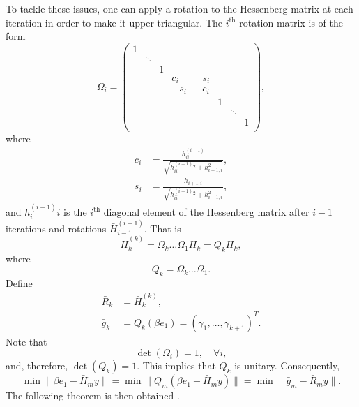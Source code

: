 To tackle these issues, one can apply a rotation to the Hessenberg matrix at each iteration in order to make it upper triangular. The $i^{\textrm{th}}$ rotation matrix is of the form \cite[Equation 6.34]{iter_method_saad}
\begin{equation}
    \Omega_i =
    \begin{pmatrix}
        1 &        &   &      &  &     &   &        &   \\
          & \ddots &   &      &  &     &   &        &   \\
          &        & 1 &      &  &     &   &        &   \\
          &        &   & c_i  &  & s_i &   &        &   \\
          &        &   & -s_i &  & c_i &   &        &   \\
          &        &   &      &  &     & 1 &        &   \\
          &        &   &      &  &     &   & \ddots &   \\
          &        &   &      &  &     &   &        & 1 \\
    \end{pmatrix},
\end{equation}
where \cite[Equation 6.37]{iter_method_saad}
\begin{align*}
    c_i & = \frac{h^(i-1)_{ii}}{\sqrt{h^(i-1)_{ii}^2 + h_{i+1,i}^2}}, \\
    s_i & = \frac{h_{i+1,i}}{\sqrt{h^(i-1)_{ii}^2 + h_{i+1,i}^2}},
\end{align*}
and $h^(i-1)_ii$ is the $i^{\textrm{th}}$ diagonal element of the Hessenberg matrix after $i-1$ iterations and rotations $\bar{H}^(i-1)_{i-1}$. That is 
\[
    \bar{H}^(k)_k = \Omega_{k}\dots\Omega_1\bar{H}_k = Q_k\bar{H}_k,
\]
where
\[
    Q_k = \Omega_k\dots\Omega_1.
\]
Define 
\begin{subequations}
    \begin{align}
        \bar{R}_k &= \bar{H}^(k)_k \label{eq:gmres_Rk}, \\
        \bar{g}_k &= Q_k(\beta e_1) = (\gamma_1, \dots, \gamma_{k+1})^T \label{eq:gmres_gk}.
    \end{align}
\end{subequations} Note that 
\[
    \det(\Omega_i) = 1, \quad \forall i,
\]
and, therefore, $\det(Q_k) = 1$. This implies that $Q_k$ is unitary. Consequently,
\[
    \min\|\beta e_1 - \bar{H}_m y\| = \min\|Q_m(\beta e_1 - \bar{H}_m y)\| = \min\|\bar{g}_m - \bar{R}_m y\|.
\]
The following theorem is then obtained \cite[Proposition 6.9]{iter_method_saad}.
